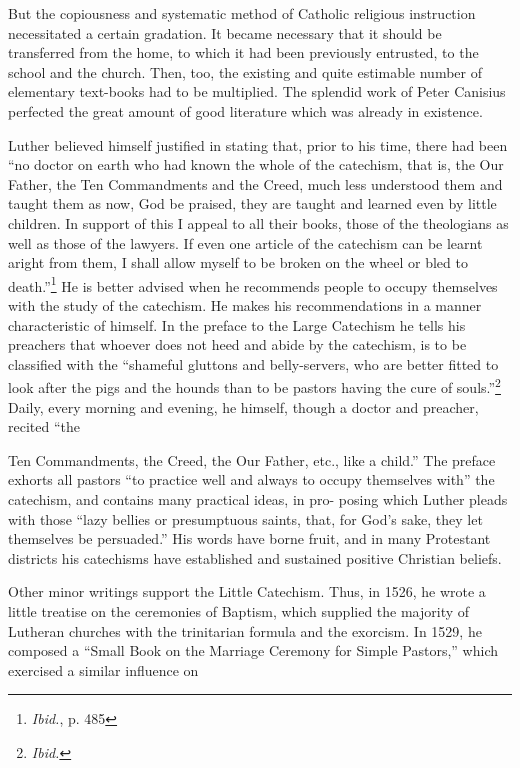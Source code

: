 But the
copiousness and systematic method of Catholic religious instruction
necessitated a certain gradation. It became necessary that it should be
transferred from the home, to which it had been previously entrusted,
to the school and the church. Then, too, the existing and quite estimable
number of elementary text-books had to be multiplied. The
splendid work of Peter Canisius perfected the great amount of good
literature which was already in existence.

Luther believed himself justified in stating that, prior to his time, there
had been “no doctor on earth who had known the whole of the catechism,
that is, the Our Father, the Ten Commandments and the Creed, much less
understood them and taught them as now, God be praised, they are taught
and learned even by little children. In support of this I appeal to all their
books, those of the theologians as well as those of the lawyers. If even one
article of the catechism can be learnt aright from them, I shall allow myself
to be broken on the wheel or bled to death.”\footnote{\textit{Ibid.}, p. 485}
 He is better advised when he
recommends people to occupy themselves with the study of the catechism. He
makes his recommendations in a manner characteristic of himself. In the
preface to the Large Catechism he tells his preachers that whoever does not
heed and abide by the catechism, is to be classified with the “shameful
gluttons and belly-servers, who are better fitted to look after the pigs and
the hounds than to be pastors having the cure of souls.”\footnote{\textit{Ibid.}}
 Daily, every
morning and evening, he himself, though a doctor and preacher, recited “the

Ten Commandments, the Creed, the Our Father, etc., like a child.” The
preface exhorts all pastors “to practice well and always to occupy
themselves with” the catechism, and contains many practical ideas, in pro-
posing which Luther pleads with those “lazy bellies or presumptuous saints,
that, for God’s sake, they let themselves be persuaded.” His words have borne
fruit, and in many Protestant districts his catechisms have established and
sustained positive Christian beliefs.

Other minor writings support the Little Catechism. Thus, in 1526,
he wrote a little treatise on the ceremonies of Baptism, which supplied
the majority of Lutheran churches with the trinitarian formula and
the exorcism. In 1529, he composed a “Small Book on the Marriage
Ceremony for Simple Pastors,” which exercised a similar influence on

